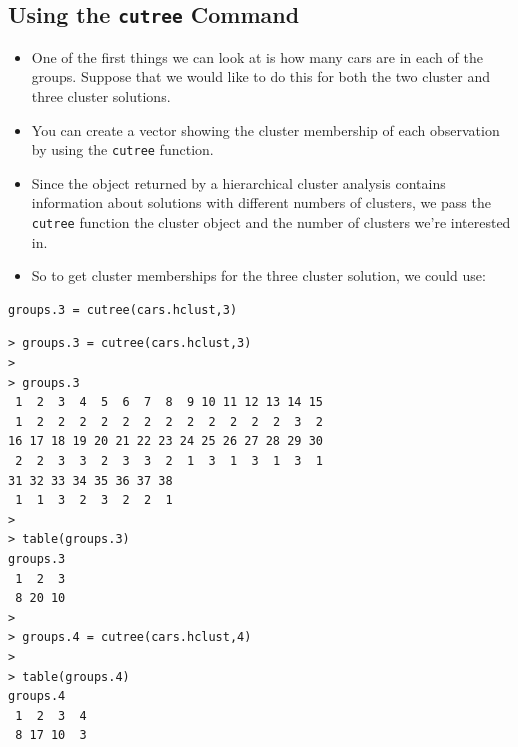 \documentclass[12pt]{article}
\begin{document}
\subsection{Using the \texttt{cutree} Command}
\begin{itemize}
\item One of the first things we can look at is how many cars are in each of the groups. Suppose that we would like to do this for both the two cluster and three cluster solutions. 
\item You can create a vector showing the cluster membership of each observation by using the \texttt{cutree} function. 
\item Since the object returned by a hierarchical cluster analysis contains information about solutions with different numbers of clusters, we pass the \texttt{cutree} function the cluster object and the number of clusters we're interested in.

\item  So to get cluster memberships for the three cluster solution, we could use:
\end{itemize}
\newpage
\begin{framed}
\begin{verbatim}
groups.3 = cutree(cars.hclust,3)
\end{verbatim}
\end{framed}

\begin{verbatim}
> groups.3 = cutree(cars.hclust,3)
>
> groups.3
 1  2  3  4  5  6  7  8  9 10 11 12 13 14 15 
 1  2  2  2  2  2  2  2  2  2  2  2  2  3  2 
16 17 18 19 20 21 22 23 24 25 26 27 28 29 30 
 2  2  3  3  2  3  3  2  1  3  1  3  1  3  1 
31 32 33 34 35 36 37 38 
 1  1  3  2  3  2  2  1 
>
> table(groups.3)
groups.3
 1  2  3 
 8 20 10 
>
> groups.4 = cutree(cars.hclust,4)
>
> table(groups.4)
groups.4
 1  2  3  4 
 8 17 10  3 
\end{verbatim}


\newpage
\end{document}
